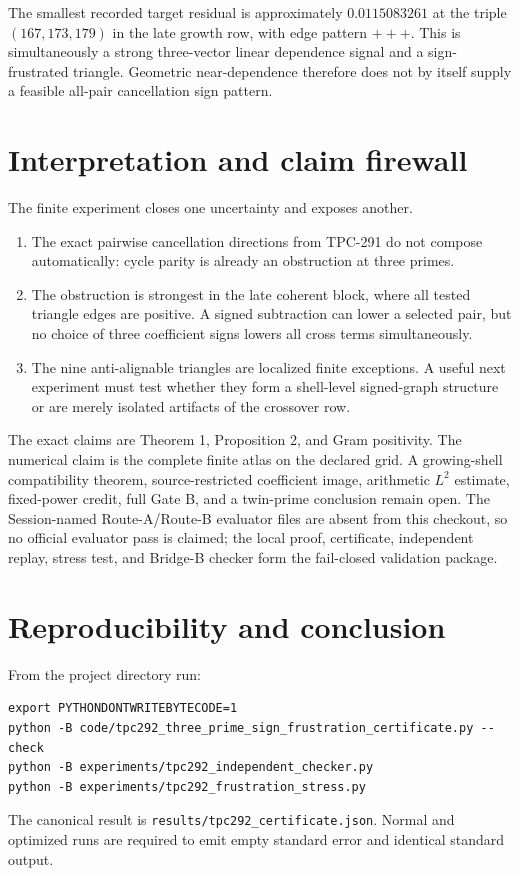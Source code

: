 \documentclass[10pt]{article}
\begin{document}
The smallest recorded target residual is approximately $0.0115083261$ at
the triple $(167,173,179)$ in the late growth row, with edge pattern $+++ $.
This is simultaneously a strong three-vector linear dependence signal and a
sign-frustrated triangle.  Geometric near-dependence therefore does not by
itself supply a feasible all-pair cancellation sign pattern.

\section{Interpretation and claim firewall}

The finite experiment closes one uncertainty and exposes another.

\begin{enumerate}
\item The exact pairwise cancellation directions from TPC-291 do not compose
      automatically: cycle parity is already an obstruction at three primes.
\item The obstruction is strongest in the late coherent block, where all
      tested triangle edges are positive.  A signed subtraction can lower a
      selected pair, but no choice of three coefficient signs lowers all
      cross terms simultaneously.
\item The nine anti-alignable triangles are localized finite exceptions.  A
      useful next experiment must test whether they form a shell-level
      signed-graph structure or are merely isolated artifacts of the
      crossover row.
\end{enumerate}

The exact claims are Theorem 1, Proposition 2, and Gram positivity.  The
numerical claim is the complete finite atlas on the declared grid.  A
growing-shell compatibility theorem, source-restricted coefficient image,
arithmetic $L^2$ estimate, fixed-power credit, full Gate B, and a twin-prime
conclusion remain open.  The Session-named Route-A/Route-B evaluator files
are absent from this checkout, so no official evaluator pass is claimed; the
local proof, certificate, independent replay, stress test, and Bridge-B
checker form the fail-closed validation package.

\section{Reproducibility and conclusion}

From the project directory run:
\begin{verbatim}
export PYTHONDONTWRITEBYTECODE=1
python -B code/tpc292_three_prime_sign_frustration_certificate.py --check
python -B experiments/tpc292_independent_checker.py
python -B experiments/tpc292_frustration_stress.py
\end{verbatim}
The canonical result is
\texttt{results/tpc292\_certificate.json}.  Normal and optimized runs are
required to emit empty standard error and identical standard output.
\end{document}
